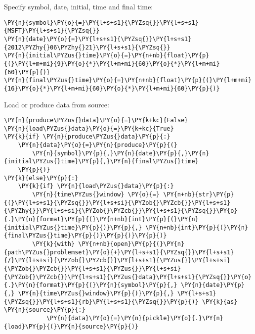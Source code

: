 \documentclass[11pt]{article}
\begin{document}
    Specify symbol, date, initial, time and final time:

    \begin{tcolorbox}[breakable, size=fbox, boxrule=1pt, pad at break*=1mm,colback=cellbackground, colframe=cellborder]
\begin{Verbatim}[commandchars=\\\{\}]
\PY{n}{symbol}\PY{o}{=}\PY{l+s+s1}{\PYZsq{}}\PY{l+s+s1}{MSFT}\PY{l+s+s1}{\PYZsq{}}
\PY{n}{date}\PY{o}{=}\PY{l+s+s1}{\PYZsq{}}\PY{l+s+s1}{2012\PYZhy{}06\PYZhy{}21}\PY{l+s+s1}{\PYZsq{}}
\PY{n}{initial\PYZus{}time}\PY{o}{=}\PY{n+nb}{float}\PY{p}{(}\PY{l+m+mi}{9}\PY{o}{*}\PY{l+m+mi}{60}\PY{o}{*}\PY{l+m+mi}{60}\PY{p}{)}
\PY{n}{final\PYZus{}time}\PY{o}{=}\PY{n+nb}{float}\PY{p}{(}\PY{l+m+mi}{16}\PY{o}{*}\PY{l+m+mi}{60}\PY{o}{*}\PY{l+m+mi}{60}\PY{p}{)}
\end{Verbatim}
\end{tcolorbox}

    Load or produce data from source:

    \begin{tcolorbox}[breakable, size=fbox, boxrule=1pt, pad at break*=1mm,colback=cellbackground, colframe=cellborder]
\begin{Verbatim}[commandchars=\\\{\}]
\PY{n}{produce\PYZus{}data}\PY{o}{=}\PY{k+kc}{False}
\PY{n}{load\PYZus{}data}\PY{o}{=}\PY{k+kc}{True}
\PY{k}{if} \PY{n}{produce\PYZus{}data}\PY{p}{:}
    \PY{n}{data}\PY{o}{=}\PY{n}{produce}\PY{p}{(}
        \PY{n}{symbol}\PY{p}{,}\PY{n}{date}\PY{p}{,}\PY{n}{initial\PYZus{}time}\PY{p}{,}\PY{n}{final\PYZus{}time}
    \PY{p}{)}
\PY{k}{else}\PY{p}{:}
    \PY{k}{if} \PY{n}{load\PYZus{}data}\PY{p}{:}
        \PY{n}{time\PYZus{}window} \PY{o}{=} \PY{n+nb}{str}\PY{p}{(}\PY{l+s+s1}{\PYZsq{}}\PY{l+s+si}{\PYZob{}\PYZcb{}}\PY{l+s+s1}{\PYZhy{}}\PY{l+s+si}{\PYZob{}\PYZcb{}}\PY{l+s+s1}{\PYZsq{}}\PY{o}{.}\PY{n}{format}\PY{p}{(}\PY{n+nb}{int}\PY{p}{(}\PY{n}{initial\PYZus{}time}\PY{p}{)}\PY{p}{,} \PY{n+nb}{int}\PY{p}{(}\PY{n}{final\PYZus{}time}\PY{p}{)}\PY{p}{)}\PY{p}{)}
        \PY{k}{with} \PY{n+nb}{open}\PY{p}{(}\PY{n}{path\PYZus{}problemset}\PY{o}{+}\PY{l+s+s1}{\PYZsq{}}\PY{l+s+s1}{/}\PY{l+s+si}{\PYZob{}\PYZcb{}}\PY{l+s+s1}{\PYZus{}}\PY{l+s+si}{\PYZob{}\PYZcb{}}\PY{l+s+s1}{\PYZus{}}\PY{l+s+si}{\PYZob{}\PYZcb{}}\PY{l+s+s1}{\PYZus{}data}\PY{l+s+s1}{\PYZsq{}}\PY{o}{.}\PY{n}{format}\PY{p}{(}\PY{n}{symbol}\PY{p}{,} \PY{n}{date}\PY{p}{,} \PY{n}{time\PYZus{}window}\PY{p}{)}\PY{p}{,} \PY{l+s+s1}{\PYZsq{}}\PY{l+s+s1}{rb}\PY{l+s+s1}{\PYZsq{}}\PY{p}{)} \PY{k}{as} \PY{n}{source}\PY{p}{:}
            \PY{n}{data}\PY{o}{=}\PY{n}{pickle}\PY{o}{.}\PY{n}{load}\PY{p}{(}\PY{n}{source}\PY{p}{)}
\end{Verbatim}
\end{tcolorbox}
\end{document}

